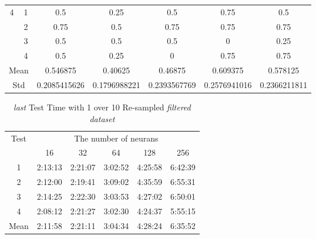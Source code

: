 \documentclass[draft,dvipsnames]{drexel-thesis}
\begin{document}
\begin{thesis}
\begin{table}[!t]
\begin{tabular}{|c|c|c|c|c|c|c|}
\multirow{4}{*}{4}    & 1                   & 0.5          & 0.25         & 0.5          & 0.75         & 0.5          \\ \cline{2-7} 
                      & 2                   & 0.75         & 0.5          & 0.75         & 0.75         & 0.75         \\ \cline{2-7} 
                      & 3                   & 0.5          & 0.5          & 0.5          & 0            & 0.25         \\ \cline{2-7} 
                      & 4                   & 0.5          & 0.25         & 0            & 0.75         & 0.75         \\ \hline
\multicolumn{2}{|c|}{Mean}                  & 0.546875     & 0.40625      & 0.46875      & 0.609375     & 0.578125     \\ \hline
\multicolumn{2}{|c|}{Std}                   & 0.2085415626 & 0.1796988221 & 0.2393567769 & 0.2576941016 & 0.2366211811 \\ \hline
\end{tabular}
\end{table}

\begin{table}[!t]
\centering
\caption{{\em last} Test Time with 1 over 10 Re-sampled {\em filtered dataset}}
\label{tbl:last_1_10_time}
\begin{tabular}{|c|c|c|c|c|c|}
\hline
\multirow{2}{*}{Test}      & \multicolumn{5}{c|}{The number of neurans}                                                                                                               \\ \cline{2-6} 
                           & 16                           & 32                           & 64                           & 128                          & 256                          \\ \hline
1                          & 2:13:13                      & 2:21:07                      & 3:02:52                      & 4:25:58                      & 6:42:39                      \\ \hline
2                          & 2:12:00                      & 2:19:41                      & 3:09:02                      & 4:35:59                      & 6:55:31                      \\ \hline
3                          & 2:14:25                      & 2:22:30                      & 3:03:53                      & 4:27:02                      & 6:50:01                      \\ \hline
4                          & 2:08:12                      & 2:21:27                      & 3:02:30                      & 4:24:37                      & 5:55:15                      \\ \hline
\multicolumn{1}{|l|}{Mean} & \multicolumn{1}{l|}{2:11:58} & \multicolumn{1}{l|}{2:21:11} & \multicolumn{1}{l|}{3:04:34} & \multicolumn{1}{l|}{4:28:24} & \multicolumn{1}{l|}{6:35:52} \\ \hline
\end{tabular}
\end{table}


\end{thesis}
\end{document}
